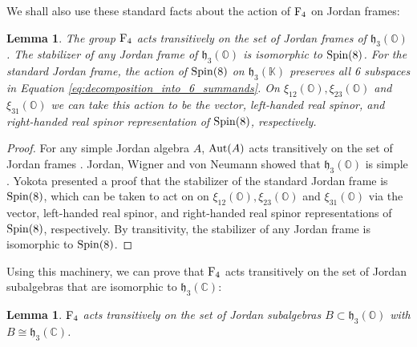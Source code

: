 \documentclass{article}
\theoremstyle{plain}
\newtheorem{lem}[thm]{Lemma}
\theoremstyle{remark}
\theoremstyle{definition}
\newcommand{\C}{{\mathbb C}}  %
\renewcommand{\O}{{\mathbb O}}  %
\newcommand{\K}{{\mathbb K}}   %
\newcommand{\Aut}{{\rm Aut}}  %
\newcommand{\Spin}{{\rm Spin}}    %
\newcommand{\F}{{\rm F}}       %
\newcommand{\h}{\mathfrak{h}}  %
\begin{document}
We shall also use these standard facts about the action of $\F_4$ on Jordan frames:

\begin{lem}
\label{lem:Jordan_frames}
The group $\F_4$ acts transitively on the set of Jordan frames of $\h_3(\O)$.  The stabilizer of any Jordan frame of $\h_3(\O)$ is isomorphic to $\Spin(8)$.  For the standard Jordan frame, the action of $\Spin(8)$ on $\h_3(\K)$ preserves all 6 subspaces in Equation \eqref{eq:decomposition_into_6_summands}.  On $\xi_{12}(\O), \xi_{23}(\O)$ and $\xi_{31}(\O)$ we can take this action to be the vector, left-handed real spinor, and right-handed real spinor representation of $\Spin(8)$, respectively.

\end{lem}

\begin{proof}
For any simple Jordan algebra $A$, $\Aut(A)$ acts transitively on the set of Jordan frames \cite[Thm.\ IV.2.5]{FarautKoranyi}.   Jordan, Wigner and von Neumann showed that $\h_3(\O)$ is simple \cite{JVW}.   Yokota \cite[Thm.\ 2.7.1]{Yokota} presented a proof that the stabilizer of the standard Jordan frame is $\Spin(8)$, which can be taken to act on on $\xi_{12}(\O), \xi_{23}(\O)$ and $\xi_{31}(\O)$ via the vector, left-handed real spinor, and right-handed real spinor representations of $\Spin(8)$,  respectively.  By transitivity, the stabilizer of any Jordan frame is isomorphic to $\Spin(8)$.  %
\end{proof}

Using this machinery, we can prove that $\F_4$ acts transitively on the set of Jordan subalgebras that are isomorphic to $\h_3(\C)$:

\begin{lem}
\label{lem:transitivity_for_subalgebras}
$\F_4$ acts transitively on the set of Jordan subalgebras $B \subset \h_3(\O)$ with $B \cong \h_3(\C)$.
\end{lem}
\end{document}
